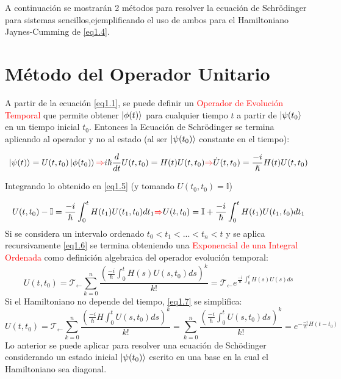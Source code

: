 \documentclass{book}
\begin{document}
A continuación se mostrarán 2 métodos para resolver la ecuación de Schr\"odinger para sistemas sencillos,ejemplificando el uso de ambos para el Hamiltoniano Jaynes-Cumming de \ref{eq1.4}.

\section{Método del Operador Unitario}

A partir de la ecuación \ref{eq1.1}, se puede definir un \textcolor{red}{Operador de Evolución Temporal} que permite obtener $\ket{\phi(t)}$ para cualquier tiempo $t$ a partir de $\ket{\psi(t_0}$ en un tiempo inicial $t_0$. Entonces la Ecuación de Schr\"odinger se termina aplicando al operador y no al estado (al ser $\ket{\psi(t_0)}$ constante en el tiempo):

\begin{equation}\label{eq1.5}\ket{\psi(t)}=U(t,t_0)\ket{\phi(t_0)} \textcolor{red}{\Rightarrow} i\hslash\frac{d}{dt}U(t,t_0)=H(t)U(t,t_0)\textcolor{red}{\Rightarrow}\dot{U}(t,t_0)=\frac{-i}{\hslash}H(t)U(t,t_0)\end{equation}

Integrando lo obtenido en \ref{eq1.5} (y tomando $U(t_0,t_0)=\mathbb{I}$) 

\begin{equation}\label{eq1.6}U(t,t_0)-\mathbb{I}=\frac{-i}{\hslash}\int_0^t H(t_1)U(t_1,t_0) dt_1 \textcolor{red}{\Rightarrow} U(t,t_0)=\mathbb{I}+\frac{-i}{\hslash}\int_0^t H(t_1)U(t_1,t_0) dt_1 \end{equation}
Si se considera un intervalo ordenado $t_0<t_1<...<t_n<t$ y se aplica recursivamente \ref{eq1.6} se termina obteniendo una \textcolor{red}{Exponencial de una Integral Ordenada} como definición algebraica del operador evolución temporal:
\begin{equation}\label{eq1.7}U(t,t_0)=\mathcal{T}_{\leftarrow}\sum_{k=0}^{n} \frac{(\frac{-i}{\hslash}\int_0^t H(s)U(s,t_0) ds)^k}{k!}=\mathcal{T}_{\leftarrow}e^{ \frac{-i}{\hslash}\int_0^t H(s)U(s) ds}\end{equation}
Si el Hamiltoniano no depende del tiempo, \ref{eq1.7} se simplifica:
\begin{equation}\label{eq1.8}U(t,t_0)=\mathcal{T}_{\leftarrow}\sum_{k=0}^{n} \frac{(\frac{-i}{\hslash} H \int_0^t U(s,t_0) ds)^k}{k!}=\sum_{k=0}^{n} \frac{(\frac{-i}{\hslash}\int_0^t U(s,t_0) ds)^k}{k!}=e^{-\frac{-i}{\hslash}H (t-t_0)}\end{equation}
Lo anterior se puede aplicar para resolver una ecuación de Sch\"odinger considerando un estado inicial $\ket{\psi(t_0)}$ escrito en una base en la cual el Hamiltoniano sea diagonal. 
\end{document}
